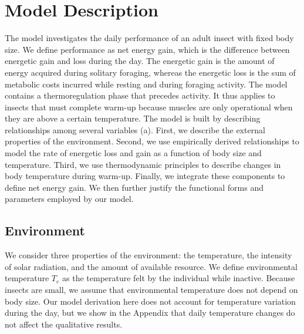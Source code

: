 \section*{Model Description}


The model investigates the daily performance of an adult insect with fixed body size.
We define performance as net energy gain, which is the difference between energetic gain and loss during the day.
The energetic gain is the amount of energy acquired during solitary foraging, whereas the energetic loss is the sum of metabolic costs incurred while resting and during foraging activity.
The model contains a thermoregulation phase that precedes activity.
It thus applies to insects that must complete warm-up because muscles are only operational when they are above a certain temperature.
The model is built by describing relationships among several variables (a).
First, we describe the external properties of the environment.
Second, we use empirically derived relationships to model the rate of energetic loss and gain as a function of body size and temperature.
Third, we use thermodynamic principles to describe changes in body temperature during warm-up.
Finally, we integrate these components to define net energy gain.
We then further justify the functional forms and parameters employed by our model.

\subsection*{Environment}

We consider three properties of the environment: the temperature, the intensity of solar radiation, and the amount of available resource.
We define environmental temperature $T_e$ as the temperature felt by the individual while inactive.
Because insects are small, we assume that environmental temperature does not depend on body size. %
Our model derivation here does not account for temperature variation during the day, but we show in the Appendix that daily temperature changes do not affect the qualitative results.

